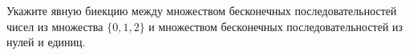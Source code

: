 Укажите явную биекцию между множеством бесконечных последовательностей чисел из множества $\{0, 1, 2\}$ и множеством
бесконечных последовательностей из нулей и единиц.